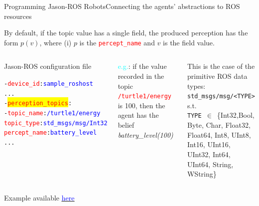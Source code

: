 \documentclass[compress]{beamer}
\newcommand{\yamlkey}[1]{\textcolor{red}{\texttt{#1}}}
\newcommand{\yamlvalue}[1]{\textcolor{blue}{\texttt{#1}}}
\newcommand{\link}[2]{\href{#1}{\underline{\textcolor{blue}{#2}}}}
\begin{document}
\begin{frame}[fragile]{Programming Jason-ROS Robots}{Connecting the agents' abstractions to ROS resources}


\footnotesize
By default, if the topic value has a single field, the produced perception has the form $p(v)$, where (i) $p$ is the \yamlkey{percept\_name} and $v$ is the field value.

\vspace{.5cm}

\begin{columns}
 
\begin{block}{{\scriptsize Jason-ROS configuration file}}

\scriptsize
  \begin{alltt}
- \yamlkey{device_id}: \yamlvalue{sample_roshost}    
     ...
  - \colorbox{yellow}{\yamlkey{perception_topics}}:     
    - \yamlkey{topic_name}: \yamlvalue{/turtle1/energy}
      \yamlkey{topic_type}: \yamlvalue{std_msgs/msg/Int32}
      \yamlkey{percept_name}: \yamlvalue{battery_level} 
     ...
  \end{alltt}
\end{block}  

 \scriptsize
 \textcolor{cyan}{e.g.}: if the value recorded in the topic \yamlkey{/turtle1/energy} is 100, then the agent has the belief \textit{battery\_level(100)}

 \vspace{3em}
 
 \tiny This is the case of the primitive ROS data types:
 \texttt{std\_msgs/msg/<TYPE>} s.t. \\\texttt{TYPE }$\in$\ \{Int32,Bool, Byte, Char, Float32, Float64, Int8, UInt8, Int16, UInt16, UInt32, Int64, UInt64, String, WString\}
 
 
\end{columns}

\vfill
    {\tiny Example available \link{https://github.com/issia-2026-jason-ros/turtle-example/blob/master/src/agt/robot1.yaml}{here}}

\end{frame}
\end{document}

